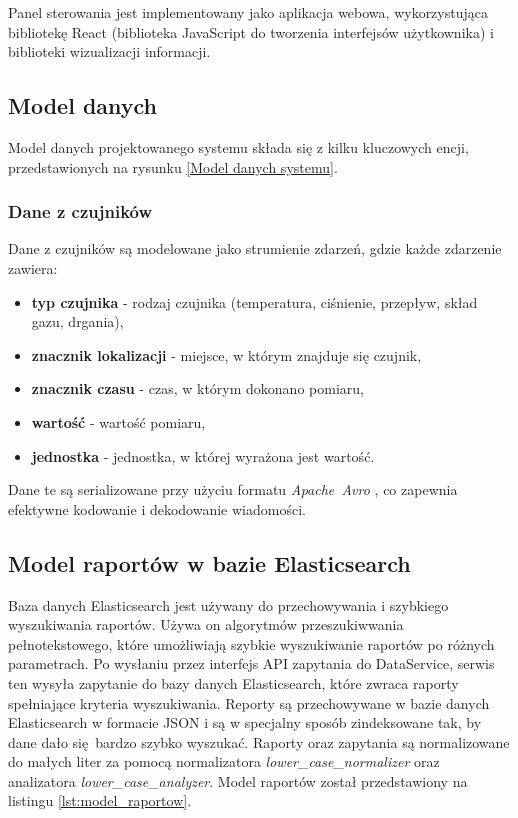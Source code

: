 \vspace{0.3em}

Panel sterowania jest implementowany jako aplikacja webowa, wykorzystująca bibliotekę React (biblioteka JavaScript do tworzenia interfejsów użytkownika) i biblioteki wizualizacji informacji.

\subsection{Model danych}
\label{subsec:model_danych}

Model danych projektowanego systemu składa się z kilku kluczowych encji, przedstawionych na rysunku \ref{Model danych systemu}.


\subsubsection{Dane z czujników}
\label{subsubsec:dane_czujnikow}

Dane z czujników są modelowane jako strumienie zdarzeń, gdzie każde zdarzenie zawiera:

\begin{itemize}
    \item \textbf{typ czujnika} - rodzaj czujnika (temperatura, ciśnienie, przepływ, skład gazu, drgania),
    \item \textbf{znacznik lokalizacji} - miejsce, w którym znajduje się czujnik,
    \item \textbf{znacznik czasu} - czas, w którym dokonano pomiaru,
    \item \textbf{wartość} - wartość pomiaru,
    \item \textbf{jednostka} - jednostka, w której wyrażona jest wartość.
\end{itemize}

\vspace{0.3em}

Dane te są serializowane przy użyciu formatu \mbox{\textit{Apache Avro}} \cite{avro_documentation}, co zapewnia efektywne kodowanie i dekodowanie wiadomości.

\subsection{Model raportów w bazie Elasticsearch}
\label{subsec:model_raportow}

Baza danych Elasticsearch jest używany do przechowywania i szybkiego wyszukiwania raportów. Używa on algorytmów przeszukiwwania pełnotekstowego, które umożliwiają szybkie wyszukiwanie raportów po różnych parametrach. Po wysłaniu przez interfejs API zapytania do DataService, serwis ten wysyła zapytanie do bazy danych Elasticsearch, które zwraca raporty spełniające kryteria wyszukiwania. Reporty są przechowywane w bazie danych Elasticsearch w formacie JSON i są w specjalny sposób zindeksowane tak, by dane dało się bardzo szybko wyszukać. Raporty oraz zapytania są normalizowane do małych liter za pomocą normalizatora \textit{lower\_case\_normalizer} oraz analizatora \textit{lower\_case\_analyzer}. Model raportów został przedstawiony na listingu \ref{lst:model_raportow}.

